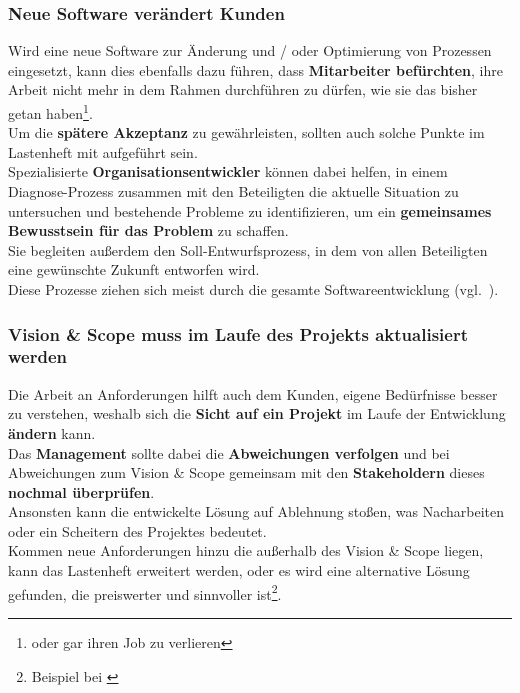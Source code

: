 \subsubsection*{Neue Software verändert Kunden}
Wird eine neue Software zur Änderung und / oder Optimierung von Prozessen eingesetzt, kann dies ebenfalls dazu führen, dass \textbf{Mitarbeiter befürchten}, ihre Arbeit nicht mehr in dem Rahmen durchführen zu dürfen, wie sie das bisher getan haben\footnote{oder gar ihren Job zu verlieren}.\\
Um die \textbf{spätere Akzeptanz} zu gewährleisten, sollten auch solche Punkte im Lastenheft mit aufgeführt sein.\\
Spezialisierte \textbf{Organisationsentwickler} können dabei helfen, in einem Diagnose-Prozess zusammen mit den Beteiligten die aktuelle Situation zu untersuchen und bestehende Probleme zu identifizieren, um ein \textbf{gemeinsames Bewusstsein für das Problem} zu schaffen.\\
Sie begleiten außerdem den Soll-Entwurfsprozess, in dem von allen Beteiligten eine gewünschte Zukunft entworfen wird.\\
Diese Prozesse ziehen sich meist durch die gesamte Softwareentwicklung (vgl.~\cite[53]{Wed09}).\\

\subsubsection*{Vision \& Scope muss im Laufe des Projekts aktualisiert werden}
Die Arbeit an Anforderungen hilft auch dem Kunden, eigene Bedürfnisse besser zu verstehen, weshalb sich die \textbf{Sicht auf ein Projekt} im Laufe der Entwicklung \textbf{ändern} kann.\\
Das \textbf{Management} sollte dabei die \textbf{Abweichungen verfolgen} und bei Abweichungen zum Vision \& Scope gemeinsam mit den \textbf{Stakeholdern} dieses \textbf{nochmal überprüfen}.\\
Ansonsten kann die entwickelte Lösung auf Ablehnung stoßen, was Nacharbeiten oder ein Scheitern des Projektes bedeutet.\\
Kommen neue Anforderungen hinzu die außerhalb des Vision \& Scope liegen, kann das Lastenheft erweitert werden, oder es wird eine alternative Lösung gefunden, die preiswerter und sinnvoller ist\footnote{Beispiel bei \cite[53]{Wed09}}.